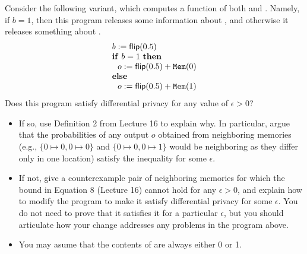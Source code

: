 \documentclass[10pt]{article}
\begin{document}
\begin{enumerate}
Consider the following variant, which computes a function of both  and . Namely, if $b = 1$, then this program releases some information about , and otherwise it releases something about .
\begin{equation}
\begin{array}{l}
%
b := \flip(0.5) \\
\mathbf{if}\ b = 1\ \mathbf{then} \\
\ \ o := \flip(0.5) + \pderef{0} \\
\mathbf{else} \\
\ \ o := \flip(0.5) + \pderef{1}
\end{array}
\end{equation}
Does this program satisfy differential privacy for any value of $\epsilon > 0$? 
\begin{itemize}
\item If so, use Definition 2 from Lecture 16 to explain why. In particular, argue that the probabilities of any output $o$ obtained from neighboring memories (e.g., $\{0 \mapsto 0, 0 \mapsto 0\}$ and $\{0 \mapsto 0, 0 \mapsto 1\}$ would be neighboring as they differ only in one location) satisfy the inequality for some $\epsilon$.
\item If not, give a counterexample pair of neighboring memories for which the bound in Equation 8 (Lecture 16) cannot hold for any $\epsilon > 0$, and explain how to modify the program to make it satisfy differential privacy for some $\epsilon$. You do not need to prove that it satisfies it for a particular $\epsilon$, but you should articulate how your change addresses any problems in the program above. 
\item You may asume that the contents of \pderefop are always either 0 or 1.
\end{itemize}

\newpage


\end{enumerate}
\end{document}
